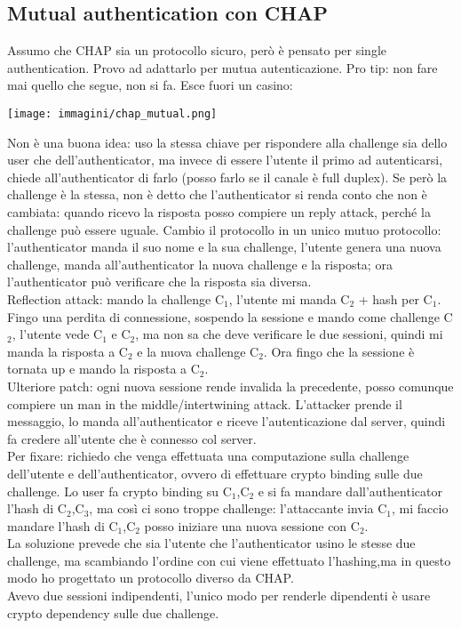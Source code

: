 \documentclass[16px]{article}
\begin{document}
\subsection{Mutual authentication con CHAP}
Assumo che CHAP sia un protocollo sicuro, però è pensato per single authentication. Provo ad adattarlo per mutua autenticazione. Pro tip: non fare mai quello che segue, non si fa. Esce fuori un casino:
\begin{center}
\texttt{[image: immagini/chap\_mutual.png]}
\end{center}
Non è una buona idea: uso la stessa chiave per rispondere alla challenge sia dello user che dell'authenticator, ma invece di essere l'utente il primo ad autenticarsi, chiede all'authenticator di farlo (posso farlo se il canale è full duplex). Se però la challenge è la stessa, non è detto che l'authenticator si renda conto che non è cambiata: quando ricevo la risposta posso compiere un reply attack, perché la challenge può essere uguale. Cambio il protocollo in un unico mutuo protocollo: l'authenticator manda il suo nome e la sua challenge, l'utente genera una nuova challenge, manda all'authenticator la nuova challenge e la risposta; ora l'authenticator può verificare che la risposta sia diversa.\\ Reflection attack: mando la challenge C$_{1}$, l'utente mi manda C$_{2}$ + hash per C$_{1}$. Fingo una perdita di connessione, sospendo la sessione e mando come challenge C$_{2}$, l'utente vede C$_{1}$ e C$_{2}$, ma non sa che deve verificare le due sessioni, quindi mi manda la risposta a C$_{2}$ e la nuova challenge C$_{2}$. Ora fingo che la sessione è tornata up e mando la risposta a C$_{2}$.\\ Ulteriore patch: ogni nuova sessione rende invalida la precedente, posso comunque compiere un man in the middle/intertwining attack. L'attacker prende il messaggio, lo manda all'authenticator e riceve l'autenticazione dal server, quindi fa credere all'utente che è connesso col server.\\ Per fixare: richiedo che venga effettuata una computazione sulla challenge dell'utente e dell'authenticator, ovvero di effettuare crypto binding sulle due challenge. Lo user fa crypto binding su C$_{1}$,C$_{2}$ e si fa mandare dall'authenticator l'hash di C$_{2}$,C$_{3}$, ma così ci sono troppe challenge: l'attaccante invia C$_{1}$, mi faccio mandare l'hash di C$_{1}$,C$_{2}$ posso iniziare una nuova sessione con C$_{2}$.\\ La soluzione prevede che sia l'utente che l'authenticator usino le stesse due challenge, ma scambiando l'ordine con cui viene effettuato l'hashing,ma in questo modo ho progettato un protocollo diverso da CHAP.\\ Avevo due sessioni indipendenti, l'unico modo per renderle dipendenti è usare crypto dependency sulle due challenge.
\end{document}
